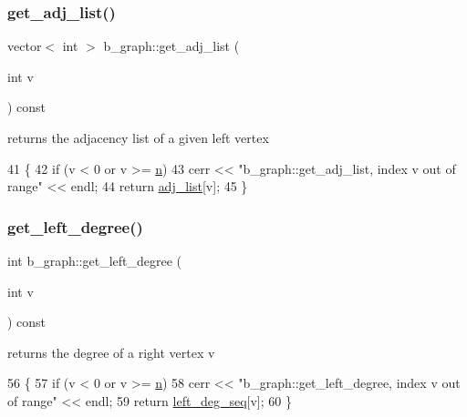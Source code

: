 \subsubsection{\texorpdfstring{get\+\_\+adj\+\_\+list()}{get\_adj\_list()}}
{\footnotesize\ttfamily vector$<$ int $>$ b\+\_\+graph\+::get\+\_\+adj\+\_\+list (\begin{DoxyParamCaption}\item[{int}]{v }\end{DoxyParamCaption}) const}



returns the adjacency list of a given left vertex 


\begin{DoxyCode}
41 \{
42   \textcolor{keywordflow}{if} (v < 0 or v >= \hyperlink{classb__graph_a9e211d40c1799bc9b125de472ff06642}{n})
43     cerr << \textcolor{stringliteral}{"b\_graph::get\_adj\_list, index v out of range"} << endl;
44   \textcolor{keywordflow}{return} \hyperlink{classb__graph_a2a89d2e8f958270952aab2e8769b7342}{adj\_list}[v];
45 \}
\end{DoxyCode}
\mbox{\label{classb__graph_ac64ac5cb1197d8008e07babc333eb3ea}} 
\subsubsection{\texorpdfstring{get\+\_\+left\+\_\+degree()}{get\_left\_degree()}}
{\footnotesize\ttfamily int b\+\_\+graph\+::get\+\_\+left\+\_\+degree (\begin{DoxyParamCaption}\item[{int}]{v }\end{DoxyParamCaption}) const}



returns the degree of a right vertex v 


\begin{DoxyCode}
56 \{
57   \textcolor{keywordflow}{if} (v < 0 or v >= \hyperlink{classb__graph_a9e211d40c1799bc9b125de472ff06642}{n})
58     cerr << \textcolor{stringliteral}{"b\_graph::get\_left\_degree, index v out of range"} << endl;
59   \textcolor{keywordflow}{return} \hyperlink{classb__graph_a311d16462dbb10c47b3a6c80a42139d9}{left\_deg\_seq}[v];
60 \}
\end{DoxyCode}
\mbox{\label{classb__graph_afd65fb655f7e24217393a10533b87d3c}} 
